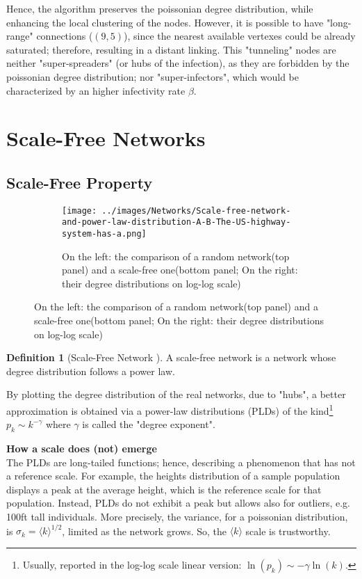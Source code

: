 \documentclass[a4paper,12pt,twoside]{book} %
\theoremstyle{definition}
\newtheorem{definition}{Definition}[section]
\begin{document}
Hence, the algorithm preserves the poissonian degree distribution, while enhancing the local clustering of the nodes. However, it is possible to have "long-range" connections ($(9,5)$), since the nearest available vertexes could be already saturated; therefore, resulting in a distant linking. This "tunneling" nodes are neither "super-spreaders" (or hubs of the infection), as they are forbidden by the poissonian degree distribution; nor "super-infectors", which would be characterized by an higher infectivity rate $\beta$.

\newpage
\section{Scale-Free Networks}
\subsection{Scale-Free Property}

\begin{figure}[h]
    \begin{subfigure}{\textwidth}
        \texttt{[image: ../images/Networks/Scale-free-network-and-power-law-distribution-A-B-The-US-highway-system-has-a.png]}
        \centering
        \caption{On the left: the comparison of a random network(top panel) and a scale-free one(bottom panel; On the right: their degree distributions on log-log scale) \cite{barabasi::2016networkbook}}
        \label{fig:PLDsVSEBDs}
    \end{subfigure}
\end{figure}

\begin{definition}[Scale-Free Network \cite{Barabasi:1999_ScalRndNet}]
	A scale-free network is a network whose degree distribution follows a power law.
\end{definition}

By plotting the degree distribution of the real networks, due to "hubs", a better approximation is obtained via a power-law distributions (PLDs) of the kind\footnote{Usually, reported in the log-log scale linear version: $\ln(p_k) \sim -\gamma \ln(k)$.} $p_k \sim k^{-\gamma}$  where $\gamma$ is called the "degree exponent". 

{\large \textbf{How a scale does (not) emerge}} \\
The PLDs are long-tailed functions; hence, describing a phenomenon that has not a reference scale.
For example, the heights distribution of a sample population displays a peak at the average height, which is the reference scale for that population. Instead, PLDs do not exhibit a peak but allows also for outliers, e.g. 100ft tall individuals.
More precisely, the variance, for a poissonian distribution, is $\sigma_k = \langle k \rangle ^ {1/2}$, limited as the network grows. So, the $\langle k \rangle$ scale is trustworthy. 
\end{document}
